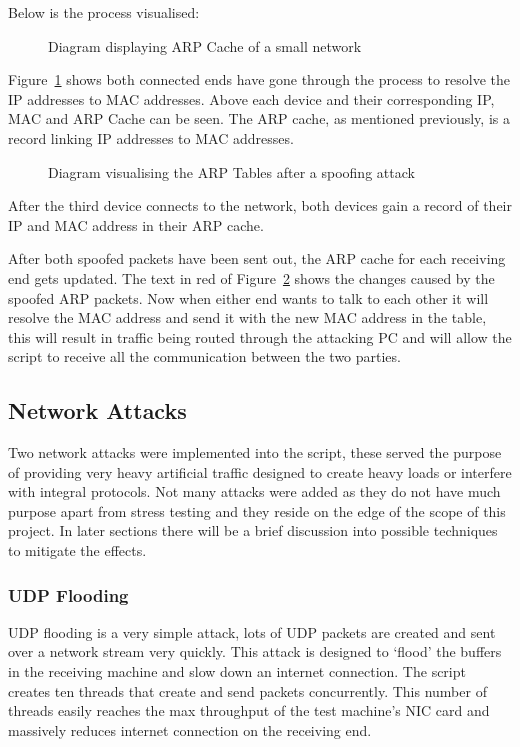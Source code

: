 Below is the process visualised:


\begin{figure}[h]
	\caption{Diagram displaying ARP Cache of a small network}
	\label{ref:arp_before}
\end{figure}

Figure~\ref{ref:arp_before} shows both connected ends have gone through the process to resolve the IP addresses to MAC addresses. Above each device and their corresponding IP, MAC and ARP Cache can be seen. The ARP cache, as mentioned previously, is a record linking IP addresses to MAC addresses.


\begin{figure}[h]
	\caption{Diagram visualising the ARP Tables after a spoofing attack}
	\label{ref:arp_after}
\end{figure}

After the third device connects to the network, both devices gain a record of their IP and MAC address in their ARP cache. 

After both spoofed packets have been sent out, the ARP cache for each receiving end gets updated. The text in red of Figure~\ref{ref:arp_after} shows the changes caused by the spoofed ARP packets. Now when either end wants to talk to each other it will resolve the MAC address and send it with the new MAC address in the table, this will result in traffic being routed through the attacking PC and will allow the script to receive all the communication between the two parties.

\subsection{Network Attacks}
Two network attacks were implemented into the script, these served the purpose of providing very heavy artificial traffic designed to create heavy loads or interfere with integral protocols. Not many attacks were added as they do not have much purpose apart from stress testing and they reside on the edge of the scope of this project. In later sections there will be a brief discussion into possible techniques to mitigate the effects. 

\subsubsection{UDP Flooding}
UDP flooding is a very simple attack, lots of UDP packets are created and sent over a network stream very quickly. This attack is designed to `flood' the buffers in the receiving machine and slow down an internet connection. The script creates ten threads that create and send packets concurrently. This number of threads easily reaches the max throughput of the test machine's NIC card and massively reduces internet connection on the receiving end.

